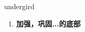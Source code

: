 
\begin{frame}
{\huge undergird}
\begin{center}
\begin{enumerate}\Large
  \item \textbf{加强，巩固...的底部}
\end{enumerate}
\end{center}
\end{frame}
